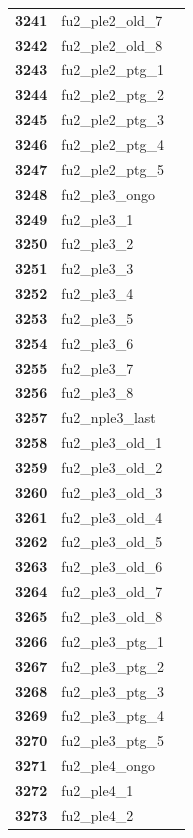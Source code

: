 \documentclass[
  letterpaper,
  DIV=11,
  numbers=noendperiod]{scrartcl}
\begin{document}
\begin{longtable}[t]{>{}cll}
\addlinespace
\textbf{3241} & fu2\_ple2\_old\_7 & \\
\textbf{3242} & fu2\_ple2\_old\_8 & \\
\textbf{3243} & fu2\_ple2\_ptg\_1 & \\
\textbf{3244} & fu2\_ple2\_ptg\_2 & \\
\textbf{3245} & fu2\_ple2\_ptg\_3 & \\
\addlinespace
\textbf{3246} & fu2\_ple2\_ptg\_4 & \\
\textbf{3247} & fu2\_ple2\_ptg\_5 & \\
\textbf{3248} & fu2\_ple3\_ongo & \\
\textbf{3249} & fu2\_ple3\_1 & \\
\textbf{3250} & fu2\_ple3\_2 & \\
\addlinespace
\textbf{3251} & fu2\_ple3\_3 & \\
\textbf{3252} & fu2\_ple3\_4 & \\
\textbf{3253} & fu2\_ple3\_5 & \\
\textbf{3254} & fu2\_ple3\_6 & \\
\textbf{3255} & fu2\_ple3\_7 & \\
\addlinespace
\textbf{3256} & fu2\_ple3\_8 & \\
\textbf{3257} & fu2\_nple3\_last & \\
\textbf{3258} & fu2\_ple3\_old\_1 & \\
\textbf{3259} & fu2\_ple3\_old\_2 & \\
\textbf{3260} & fu2\_ple3\_old\_3 & \\
\addlinespace
\textbf{3261} & fu2\_ple3\_old\_4 & \\
\textbf{3262} & fu2\_ple3\_old\_5 & \\
\textbf{3263} & fu2\_ple3\_old\_6 & \\
\textbf{3264} & fu2\_ple3\_old\_7 & \\
\textbf{3265} & fu2\_ple3\_old\_8 & \\
\addlinespace
\textbf{3266} & fu2\_ple3\_ptg\_1 & \\
\textbf{3267} & fu2\_ple3\_ptg\_2 & \\
\textbf{3268} & fu2\_ple3\_ptg\_3 & \\
\textbf{3269} & fu2\_ple3\_ptg\_4 & \\
\textbf{3270} & fu2\_ple3\_ptg\_5 & \\
\addlinespace
\textbf{3271} & fu2\_ple4\_ongo & \\
\textbf{3272} & fu2\_ple4\_1 & \\
\textbf{3273} & fu2\_ple4\_2 & \\

\end{longtable}
\end{document}
